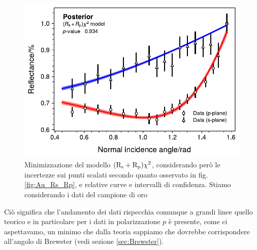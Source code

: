 \documentclass[
    prb,altaffilletter,citeautoscript,
    amsmath,amssymb,
    showpacs,showkeys,floatfix,
    reprint
]{revtex4-1}
\begin{document}
\begin{figure}
    \centering
    \includegraphics[width=\linewidth]{figures/Au_rescaled_fit.pdf}
    \caption{Minimizzazione del modello $\qty(\mathrm{R_s}+ \mathrm{R_p})\chi^2$, considerando però le incertezze sui punti scalati secondo quanto osservato in fig. \ref{fig:Au_Rs_Rp}, e relative curve e intervalli di confidenza. Stiamo considerando i dati del campione di oro}
    \label{fig:Au_rescaled_fit}
\end{figure}
Ciò significa che l'andamento dei dati rispecchia comunque a grandi linee quello teorico e in particolare per i dati in polarizzazione $p$ è presente, come ci aspettavamo, un minimo che dalla teoria sappiamo che dovrebbe corrispondere all'angolo di Brewster (vedi sezione \ref{sec:Brewster}).
\end{document}
